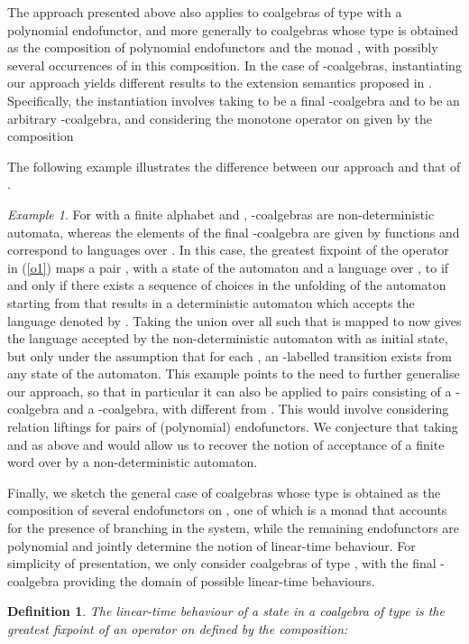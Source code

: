 \documentclass[submission,copyright,creativecommons]{eptcs}
\theoremstyle{plain}\newtheorem{theorem}{Theorem}[section]
\newtheorem{definition}[theorem]{Definition}
\theoremstyle{remark}
\newtheorem{example}[remark]{Example}
\begin{document}
The approach presented above also applies to coalgebras of type  with  a polynomial endofunctor, and more generally to coalgebras whose type is obtained as the composition of polynomial endofunctors and the monad , with possibly several occurrences of  in this composition. In the case of -coalgebras, instantiating our approach yields different results to the extension semantics proposed in \cite{JacobsSS12}. Specifically, the instantiation involves taking  to be a final -coalgebra and  to be an arbitrary -coalgebra, and considering the monotone operator on  given by the composition

The following example illustrates the difference between our approach and that of \cite{JacobsSS12}.
\begin{example}
For  with  a finite alphabet and , -coalgebras are non-deterministic automata, whereas the elements of the final -coalgebra are given by functions  and correspond to languages over . In this case, the greatest fixpoint of the operator in (\ref{o1}) maps a pair , with  a state of the automaton and  a language over , to  if and only if there exists a sequence of choices in the unfolding of the automaton starting from  that results in a deterministic automaton which accepts the language denoted by . Taking the union over all  such that  is mapped to  now gives the language accepted by the non-deterministic automaton with  as initial state, but only under the assumption that for each , an -labelled transition exists from any state of the automaton. This example points to the need to further generalise our approach, so that in particular it can also be applied to pairs consisting of a -coalgebra and a -coalgebra, with  different from . This would involve considering relation liftings for pairs of (polynomial) endofunctors. We conjecture that taking  and  as above and  would allow us to recover the notion of acceptance of a finite word over  by a non-deterministic automaton.
\end{example}
Finally, we sketch the general case of coalgebras whose type is obtained as the composition of several endofunctors on , one of which is a monad  that accounts for the presence of branching in the system, while the remaining endofunctors are polynomial and jointly determine the notion of linear-time behaviour. For simplicity of presentation, we only consider coalgebras of type , with the final -coalgebra  providing the domain of possible linear-time behaviours.
\begin{definition}
\label{linear-time-beh}
The \emph{linear-time behaviour} of a state in a coalgebra  of type  is the greatest fixpoint of an operator  on  defined by the composition:

\end{definition}
\end{document}
